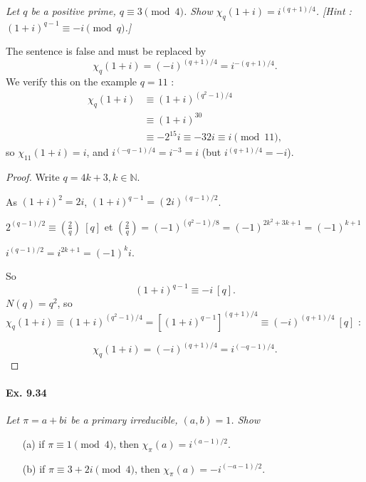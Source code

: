 \documentclass[11pt,a4paper]{article}
\newcommand{\N}{\mathbb{N}}
\newcommand{\legendre}[2]{\genfrac{(}{)}{}{}{#1}{#2}}
\begin{document}
{\it  Let $q$ be a positive prime, $q\equiv 3 \pmod 4$. Show $\chi_q(1+i) = i^{(q+1)/4}$. [Hint : $(1+i)^{q-1} \equiv -i \pmod q$.]
}

\bigskip

The sentence is false and must be replaced by
$$ \chi_q(1+i) = (-i)^{(q+1)/4 } = i^{-(q+1)/4} .$$
We verify this on the example $q=11$ :
\begin{align*}
\chi_{q}(1+i) &\equiv (1+i)^{(q^2-1)/4}\\
& \equiv (1+i)^{30}\\
&\equiv -2^{15} i \equiv -32 i \equiv i \pmod {11},
\end{align*}
so $\chi_{11}(1+i) = i$, and $i^{(-q-1)/4} = i^{-3} = i$ (but $i^{(q+1)/4} = -i$).

\begin{proof}

Write $q = 4k + 3, k \in \N$.

As $(1+i)^2 = 2i$, $(1+i)^{q-1} =  (2i)^{(q-1)/2}$.

$2^{(q-1)/2} \equiv \legendre{2}{q} \ [q]$ et $ \legendre{2}{q} = (-1)^{(q^2-1)/8} = (-1)^{2k^2+3k+1} = (-1)^{k+1}$

$i^{(q-1)/2} = i^{2k+1} = (-1)^k i$. 

So
$$ (1+i)^{q-1} \equiv -i\ [q].$$
$N(q) = q^2$, so $\chi_q(1+i) \equiv (1+i)^{(q^2-1)/4} = [(1+i)^{q-1}]^{(q+1)/4}\equiv (-i)^{(q+1)/4} \ [q]$ :

$$\chi_q(1+i) =(-i)^{(q+1)/4} = i^{(-q-1)/4}.$$
\end{proof}

\paragraph{Ex. 9.34}

{\it Let $\pi = a +bi$ be a primary irreducible, $(a,b) = 1$. Show
\begin{enumerate}
\item[(a)] if $\pi \equiv 1 \pmod 4$, then $\chi_\pi(a) = i^{(a-1)/2}$.
\item[(b)] if $\pi \equiv 3 + 2i\pmod 4$, then $\chi_\pi(a) = -i^{(-a-1)/2}$.
\end{enumerate}
}
\end{document}
